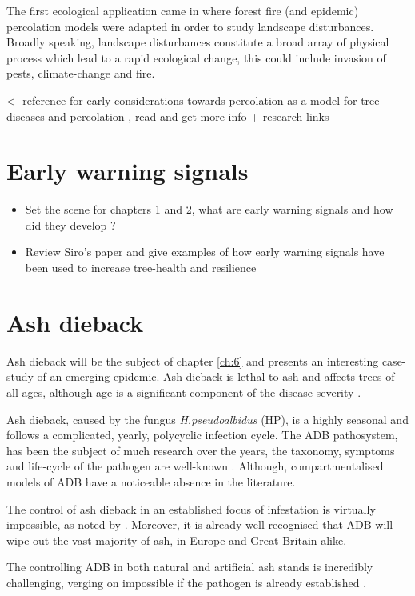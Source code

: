 The first ecological application came in \cite{pub.1031591030} where forest fire (and epidemic) percolation models were adapted in order to study landscape disturbances. Broadly speaking, landscape disturbances constitute a broad array of physical process which lead to a rapid ecological change, this could include invasion of pests, climate-change and fire.

\textemdash\cite{GRASSBERGER1983157} <- reference for early considerations towards percolation as a model for tree diseases and percolation
\textemdash\cite{SANDER2002293}, read and get more info + research links

\section{Early warning signals}

\label{section:ews}
\begin{itemize}
    \item Set the scene for chapters 1 and 2, what are early warning signals and how did they develop ?
    \item Review Siro's paper and give examples of how early warning signals have been used to increase tree-health and resilience 
\end{itemize}


\section{Ash dieback}

Ash dieback will be the subject of chapter \ref{ch:6} and presents an interesting case-study of an emerging epidemic. Ash dieback is lethal to ash and affects trees of all ages, although age is a significant component of the disease severity \cite{marccais2017estimation}. %

Ash dieback, caused by the fungus \textit{H.pseudoalbidus} (HP), is a highly seasonal \cite{bengtsson2014seasonal} and follows a complicated, yearly, polycyclic infection cycle. The ADB pathosystem, has been the subject of much research over the years, the taxonomy, symptoms and life-cycle of the pathogen are well-known \cite{https://doi.org/10.1111/mpp.12073}. Although, compartmentalised models of ADB have a noticeable absence in the literature.

The control of ash dieback in an established focus of infestation is virtually impossible, as noted by \cite{havrdova2017environmental}. Moreover, it is already well recognised that ADB will wipe out the vast majority of ash, in Europe and Great Britain alike.



The controlling ADB in both natural and artificial ash stands is incredibly challenging, verging on impossible if the pathogen is already established \cite{havrdova2017environmental}.


